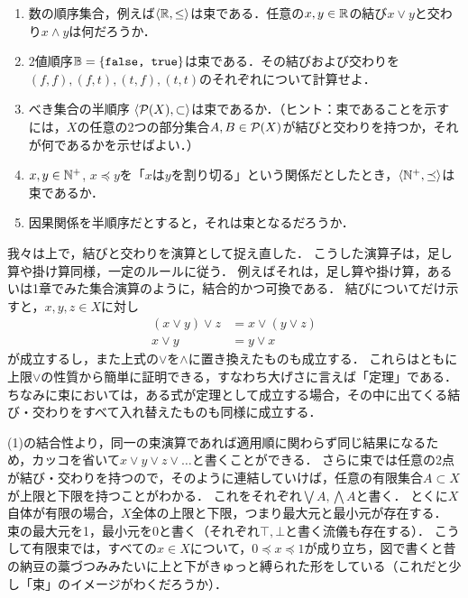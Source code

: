 \documentclass[11pt,a4paper, dvipdfmx]{jsarticle}
\begin{document}
\begin{renshu}{}{}
\begin{enumerate}
 \item 数の順序集合，例えば$\langle \mathbb{R}, \leq \rangle$は束である．任意の$x, y \in \mathbb{R}$の結び$x \vee y$と交わり$x \wedge y$は何だろうか．
 \item 2値順序$\mathbb{B} = \{ \texttt{false, true} \}$は束である．その結びおよび交わりを$(f, f), (f, t), (t, f), (t, t)$のそれぞれについて計算せよ．
 \item べき集合の半順序 $\langle \mathcal{P}(X), \subset \rangle$は束であるか．（ヒント：束であることを示すには，$X$の任意の2つの部分集合$A, B \in \mathcal{P}(X)$が結びと交わりを持つか，それが何であるかを示せばよい．）
 \item $x, y \in \mathbb{N}^+$, $x \preceq y$を「$x$は$y$を割り切る」という関係だとしたとき，$\langle \mathbb{N}^+, \preceq \rangle$は束であるか．
 \item 因果関係を半順序だとすると，それは束となるだろうか．
\end{enumerate}
 \end{renshu}

我々は上で，結びと交わりを演算として捉え直した．
こうした演算子は，足し算や掛け算同様，一定のルールに従う．
例えばそれは，足し算や掛け算，あるいは1章でみた集合演算のように，結合的かつ可換である．
結びについてだけ示すと，$x, y, z \in X$に対し
\begin{align}
(x \vee y) \vee z &= x \vee (y \vee z) \\
x \vee y &= y \vee x
\end{align}
が成立するし，また上式の$\vee$を$\wedge$に置き換えたものも成立する．
これらはともに上限$\vee$の性質から簡単に証明できる，すなわち大げさに言えば「定理」である．
ちなみに束においては，ある式が定理として成立する場合，その中に出てくる結び・交わりをすべて入れ替えたものも同様に成立する．

(1)の結合性より，同一の束演算であれば適用順に関わらず同じ結果になるため，カッコを省いて$x \vee y \vee z \vee \dots$と書くことができる．
さらに束では任意の2点が結び・交わりを持つので，そのように連結していけば，任意の有限集合$A \subset X$が上限と下限を持つことがわかる．
これをそれぞれ$\bigvee A, \bigwedge A$と書く．
とくに$X$自体が有限の場合，$X$全体の上限と下限，つまり最大元と最小元が存在する．
束の最大元を1，最小元を0と書く（それぞれ$\top, \bot$と書く流儀も存在する）．
こうして有限束では，すべての$x \in X$について，$0 \preceq x \preceq 1$が成り立ち，図で書くと昔の納豆の藁づつみみたいに上と下がきゅっと縛られた形をしている（これだと少し「束」のイメージがわくだろうか）．
\end{document}

